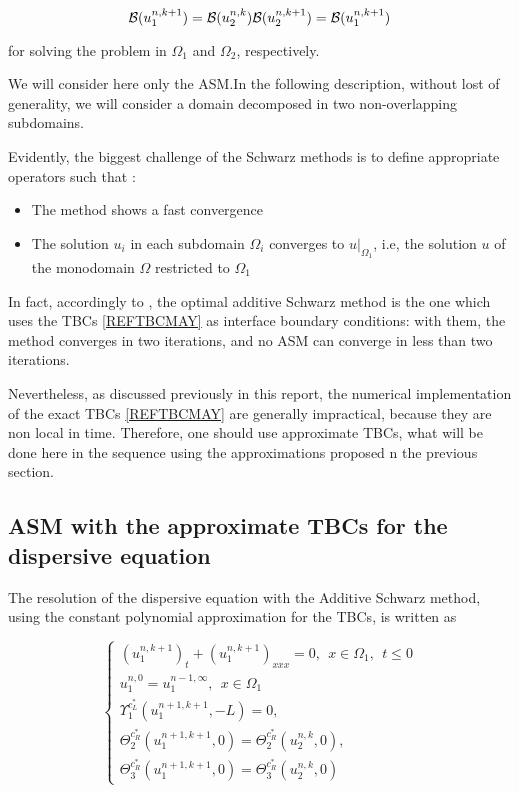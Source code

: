 $$\mathcal{B}(u_1^{n,k+1}) = \mathcal{B}(u_2^{n,k}) \\ \mathcal{B}(u_2^{n,k+1}) = \mathcal{B}(u_1^{n,k+1})$$

\noindent for solving the problem in $\Omega_1$ and $\Omega_2$, respectively.

\indent We will consider here only the ASM.In the following description, without lost of generality, we will consider a domain decomposed in two non-overlapping subdomains.

\indent Evidently, the biggest challenge of the Schwarz methods is to define appropriate operators such that :

\begin{itemize}
\item The method shows a fast convergence
\item The solution $u_i$ in each subdomain $\Omega_i$ converges to $u|_{\Omega_1}$, i.e, the solution $u$ of the monodomain $\Omega$ restricted to $\Omega_1$
\end{itemize} 

\indent In fact, accordingly to \cite{Japhet2013}, the optimal additive Schwarz method is the one which uses the TBCs \ref{REFTBCMAY} as interface boundary conditions: with them, the method converges in two iterations, and no ASM can converge in less than two iterations.

\indent Nevertheless, as discussed previously in this report, the numerical implementation of the exact TBCs \ref{REFTBCMAY} are generally impractical, because they are non local in time. Therefore, one should use approximate TBCs, what will be done here in the sequence using the approximations proposed n the previous section.

\subsection{ASM with the approximate TBCs for the dispersive equation}

\indent The resolution of the dispersive equation with the Additive Schwarz method, using the constant polynomial approximation for the TBCs, is written as

\begin{equation}
    \label{eq:problemDDM1}
    \begin{cases}
        (u_1^{n,k+1})_t + (u_1^{n,k+1})_{xxx} = 0 , \ \ x \in \Omega_1, \ \ t \leq 0\\
        u_1^{n,0} = u_1^{n-1,\infty} , \ \ x \in \Omega_1 \\
        \Upsilon_1^{c_L^*}(u_1^{n+1,k+1},-L) = 0, \\ 
        \Theta_2^{c_R^*}(u_1^{n+1,k+1},0) = \Theta_2^{c_R^*}(u_2^{n,k},0) , \\
        \Theta_3^{c_R^*}(u_1^{n+1,k+1},0) = \Theta_3^{c_R^*}(u_2^{n,k},0)
     \end{cases}
\end{equation}

